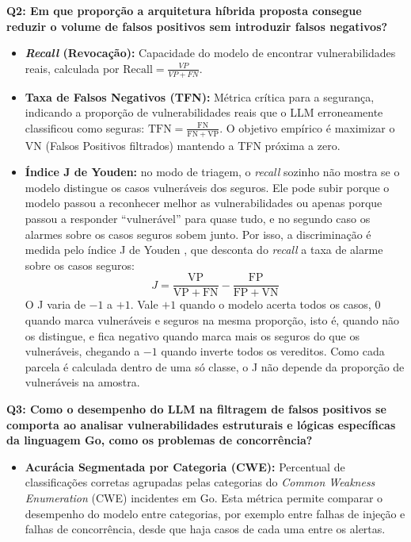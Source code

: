 \textbf{Q2: Em que proporção a arquitetura híbrida proposta consegue reduzir o volume de falsos positivos sem introduzir falsos negativos?}
\begin{itemize}
\item \textbf{\textit{Recall} (Revocação):} Capacidade do modelo de encontrar vulnerabilidades reais, calculada por $\mathrm{Recall} = \frac{VP}{VP + FN}$.
\item \textbf{Taxa de Falsos Negativos (TFN):} Métrica crítica para a segurança, indicando a proporção de vulnerabilidades reais que o LLM erroneamente classificou como seguras: $\mathrm{TFN} = \frac{\mathrm{FN}}{\mathrm{FN} + \mathrm{VP}}$. O objetivo empírico é maximizar o VN (Falsos Positivos filtrados) mantendo a TFN próxima a zero.
\item \textbf{Índice J de Youden:} no modo de triagem, o \textit{recall} sozinho não mostra se o modelo distingue os casos vulneráveis dos seguros. Ele pode subir porque o modelo passou a reconhecer melhor as vulnerabilidades ou apenas porque passou a responder ``vulnerável'' para quase tudo, e no segundo caso os alarmes sobre os casos seguros sobem junto. Por isso, a discriminação é medida pelo índice J de Youden \cite{youden1950index}, que desconta do \textit{recall} a taxa de alarme sobre os casos seguros:
$$J = \frac{\mathrm{VP}}{\mathrm{VP} + \mathrm{FN}} - \frac{\mathrm{FP}}{\mathrm{FP} + \mathrm{VN}}$$
O J varia de $-1$ a $+1$. Vale $+1$ quando o modelo acerta todos os casos, 0 quando marca vulneráveis e seguros na mesma proporção, isto é, quando não os distingue, e fica negativo quando marca mais os seguros do que os vulneráveis, chegando a $-1$ quando inverte todos os vereditos. Como cada parcela é calculada dentro de uma só classe, o J não depende da proporção de vulneráveis na amostra.
\end{itemize}

\textbf{Q3: Como o desempenho do LLM na filtragem de falsos positivos se comporta ao analisar vulnerabilidades estruturais e lógicas específicas da linguagem Go, como os problemas de concorrência?}
\begin{itemize}
\item \textbf{Acurácia Segmentada por Categoria (CWE):} Percentual de classificações corretas agrupadas pelas categorias do \textit{Common Weakness Enumeration} (CWE) incidentes em Go. Esta métrica permite comparar o desempenho do modelo entre categorias, por exemplo entre falhas de injeção e falhas de concorrência, desde que haja casos de cada uma entre os alertas.
\end{itemize}

